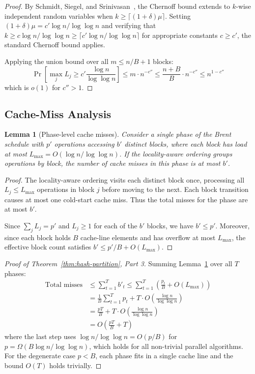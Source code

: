 \documentclass[11pt]{article}
\newtheorem{lemma}[theorem]{Lemma}
\begin{document}
\begin{proof}
By Schmidt, Siegel, and Srinivasan~\cite{schmidt1995chernoff}, the
Chernoff bound extends to $k$-wise independent random variables when
$k \ge \lceil (1+\delta)\mu \rceil$.  Setting
$(1+\delta)\mu = c'\log n/\log\log n$ and verifying that
$k \ge c\log n/\log\log n \ge \lceil c'\log n/\log\log n \rceil$
for appropriate constants $c \ge c'$, the standard Chernoff bound
applies.

Applying the union bound over all $m \le n/B + 1$ blocks:
\[
  \Pr\!\left[\max_j L_j \ge c'\frac{\log n}{\log\log n}\right]
  \le m \cdot n^{-c''}
  \le \frac{n+B}{B} \cdot n^{-c''}
  \le n^{1-c''}
\]
which is $o(1)$ for $c'' > 1$.
\end{proof}

\subsection{Cache-Miss Analysis}

\begin{lemma}[Phase-level cache misses]
\label{lem:phase-misses}
Consider a single phase of the Brent schedule with $p'$ operations
accessing $b'$ distinct blocks, where each block has load at most
$L_{\max} = O(\!\log n/\log\log n)$.  If the locality-aware ordering
groups operations by block, the number of cache misses in this phase is
at most $b'$.
\end{lemma}

\begin{proof}
The locality-aware ordering visits each distinct block once, processing
all $L_j \le L_{\max}$ operations in block $j$ before moving to the
next.  Each block transition causes at most one cold-start cache miss.
Thus the total misses for the phase are at most $b'$.

Since $\sum_j L_j = p'$ and $L_j \ge 1$ for each of the $b'$ blocks,
we have $b' \le p'$.  Moreover, since each block holds $B$ cache-line
elements and has overflow at most $L_{\max}$, the effective block count
satisfies $b' \le p'/B + O(L_{\max})$.
\end{proof}

\begin{proof}[Proof of Theorem~\ref{thm:hash-partition}, Part 3]
Summing Lemma~\ref{lem:phase-misses} over all $T$ phases:
\begin{align*}
  \text{Total misses} &\le \sum_{t=1}^T b'_t
  \le \sum_{t=1}^T \left(\frac{p_t}{B} + O(L_{\max})\right) \\
  &= \frac{1}{B}\sum_{t=1}^T p_t + T \cdot O\!\left(\frac{\log n}{\log\log n}\right) \\
  &= \frac{pT}{B} + T \cdot O\!\left(\frac{\log n}{\log\log n}\right) \\
  &= O\!\left(\frac{pT}{B} + T\right)
\end{align*}
where the last step uses $\log n / \log\log n = O(p/B)$ for
$p = \Omega(B \log n / \log\log n)$, which holds for all non-trivial
parallel algorithms.  For the degenerate case $p < B$, each phase
fits in a single cache line and the bound $O(T)$ holds trivially.
\end{proof}
\end{document}
